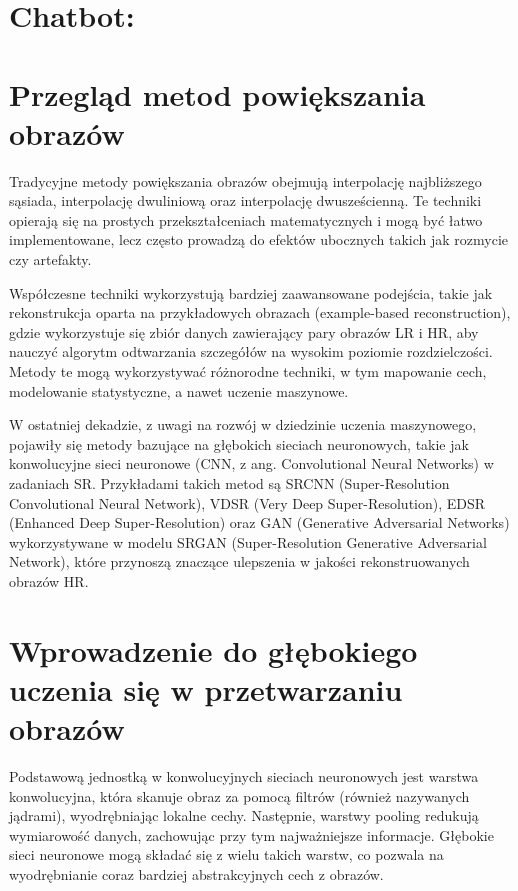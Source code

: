 \newpage
\section*{Chatbot:}

\section*{Przegląd metod powiększania obrazów}

Tradycyjne metody powiększania obrazów obejmują interpolację najbliższego sąsiada, interpolację dwuliniową oraz interpolację dwusześcienną. Te techniki opierają się na prostych przekształceniach matematycznych i mogą być łatwo implementowane, lecz często prowadzą do efektów ubocznych takich jak rozmycie czy artefakty.

Współczesne techniki wykorzystują bardziej zaawansowane podejścia, takie jak rekonstrukcja oparta na przykładowych obrazach (example-based reconstruction), gdzie wykorzystuje się zbiór danych zawierający pary obrazów LR i HR, aby nauczyć algorytm odtwarzania szczegółów na wysokim poziomie rozdzielczości. Metody te mogą wykorzystywać różnorodne techniki, w tym mapowanie cech, modelowanie statystyczne, a nawet uczenie maszynowe.

W ostatniej dekadzie, z uwagi na rozwój w dziedzinie uczenia maszynowego, pojawiły się metody bazujące na głębokich sieciach neuronowych, takie jak konwolucyjne sieci neuronowe (CNN, z ang. Convolutional Neural Networks) w zadaniach SR. Przykładami takich metod są SRCNN (Super-Resolution Convolutional Neural Network), VDSR (Very Deep Super-Resolution), EDSR (Enhanced Deep Super-Resolution) oraz GAN (Generative Adversarial Networks) wykorzystywane w modelu SRGAN (Super-Resolution Generative Adversarial Network), które przynoszą znaczące ulepszenia w jakości rekonstruowanych obrazów HR.
 
\section*{Wprowadzenie do głębokiego uczenia się w przetwarzaniu obrazów}



Podstawową jednostką w konwolucyjnych sieciach neuronowych jest warstwa konwolucyjna, która skanuje obraz za pomocą filtrów (również nazywanych jądrami), wyodrębniając lokalne cechy. Następnie, warstwy pooling redukują wymiarowość danych, zachowując przy tym najważniejsze informacje. Głębokie sieci neuronowe mogą składać się z wielu takich warstw, co pozwala na wyodrębnianie coraz bardziej abstrakcyjnych cech z obrazów.

